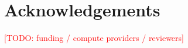 \documentclass[10pt,letterpaper]{article}
\newcommand{\TODO}[1]{\textcolor{red}{[TODO: #1]}}
\begin{document}
\appendix




\section*{Acknowledgements}
\TODO{funding / compute providers / reviewers}



\end{document}
